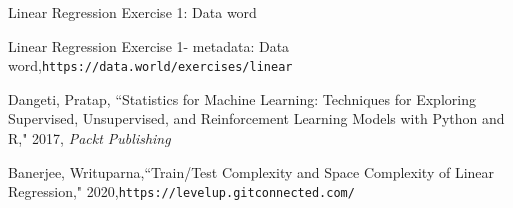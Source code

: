 \documentclass[twocolumn]{article}
\begin{document}
\begin{thebibliography}{100} %

Linear Regression Exercise 1: Data word

Linear Regression Exercise 1- metadata: Data word,\texttt{https://data.world/exercises/linear}

 Dangeti, Pratap, ``Statistics for Machine Learning: Techniques for Exploring Supervised, Unsupervised, and Reinforcement Learning Models with Python and R," 2017, \emph{Packt Publishing}

Banerjee, Writuparna,``Train/Test Complexity and Space Complexity of Linear Regression," 2020,\texttt{https://levelup.gitconnected.com/}

\end{thebibliography}
\end{document}
